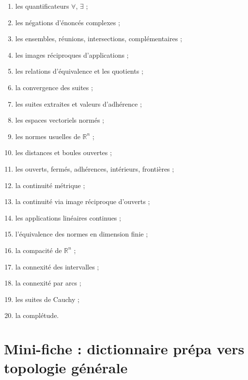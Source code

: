 \documentclass[11pt,a4paper]{article}
\theoremstyle{definition}
\theoremstyle{plain}
\newcommand{\R}{\mathbb{R}}
\begin{document}
\begin{enumerate}
    \item les quantificateurs $\forall$, $\exists$ ;
    \item les négations d'énoncés complexes ;
    \item les ensembles, réunions, intersections, complémentaires ;
    \item les images réciproques d'applications ;
    \item les relations d'équivalence et les quotients ;
    \item la convergence des suites ;
    \item les suites extraites et valeurs d'adhérence ;
    \item les espaces vectoriels normés ;
    \item les normes usuelles de $\R^n$ ;
    \item les distances et boules ouvertes ;
    \item les ouverts, fermés, adhérences, intérieurs, frontières ;
    \item la continuité métrique ;
    \item la continuité via image réciproque d'ouverts ;
    \item les applications linéaires continues ;
    \item l'équivalence des normes en dimension finie ;
    \item la compacité de $\R^n$ ;
    \item la connexité des intervalles ;
    \item la connexité par arcs ;
    \item les suites de Cauchy ;
    \item la complétude.
\end{enumerate}

\section{Mini-fiche : dictionnaire prépa vers topologie générale}
\end{document}
